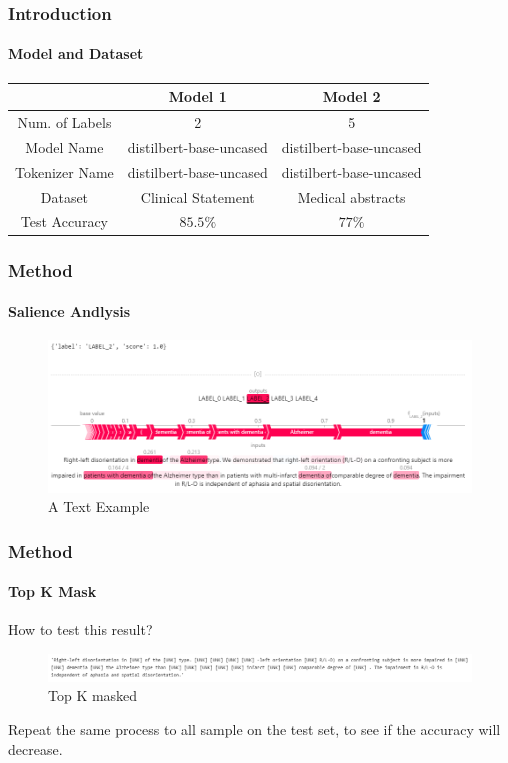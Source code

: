 \documentclass{beamer}
\begin{document}
\begin{frame}
    \frametitle{Introduction}
    \framesubtitle{Model and Dataset}

    \begin{tabular}{|c||c||c|}
        \hline
             & Model 1 & Model 2 \\ 
        \hline
            Num. of Labels & 2 & 5\\ 
        \hline
            Model Name & distilbert-base-uncased & distilbert-base-uncased\\ 
        \hline
        Tokenizer Name & distilbert-base-uncased & distilbert-base-uncased\\ 
        \hline
        Dataset & Clinical Statement  & Medical abstracts \\ 
        \hline
        Test Accuracy & $85.5\%$ & $77\%$\\ 
        \hline
        \end{tabular}

\end{frame}


\begin{frame}
    \frametitle{Method}
    \framesubtitle{Salience Andlysis}

    \begin{figure}
        \centering
            \includegraphics[width=1\textwidth]{Saliency Example4.png}
            \caption{A Text Example}
            \label{fig:TextExample}
        \end{figure}


\end{frame}

\begin{frame}
    \frametitle{Method}
    \framesubtitle{Top K Mask}
How to test this result?
    \begin{figure}
        \centering
            \includegraphics[width=1\textwidth]{Top K Masked3.png}
            \caption{Top K masked}
            \label{fig:MaskedExample}
    \end{figure}

\par
Repeat the same process to all sample on the test set, to see if the accuracy will decrease.
\end{frame}
\end{document}
